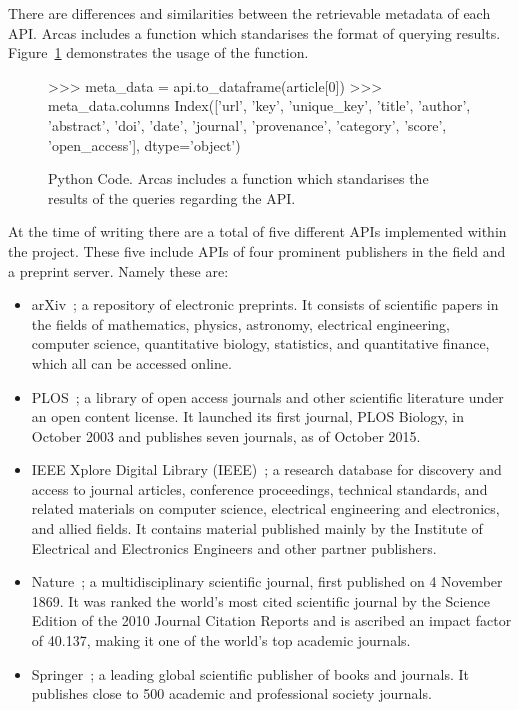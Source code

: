 There are differences and similarities between the retrievable metadata of each API. Arcas
includes a function which standarises the format of querying results. Figure~\ref{fig:arcas_to_dataframe}
demonstrates the usage of the function.

\begin{figure}[!hbtp]
    \begin{usagepy}
>>> meta_data = api.to_dataframe(article[0])
>>> meta_data.columns
Index(['url', 'key', 'unique_key', 'title', 'author', 'abstract', 'doi',
'date', 'journal', 'provenance', 'category', 'score', 'open_access'],
dtype='object')
\end{usagepy}
\caption{Python Code. Arcas includes a function which standarises the results of
the queries regarding the API.}\label{fig:arcas_to_dataframe}
\end{figure}

At the time of writing there are a total of five different APIs implemented within the project. These
five include APIs of four prominent publishers in the field and a preprint
server. Namely these are:

\begin{multicols}{2}
    \begin{itemize}
        \item arXiv~\cite{mckiernan2000}; a repository of electronic preprints.
        It consists of scientific
        papers in the fields of mathematics, physics, astronomy, electrical engineering,
        computer science, quantitative biology, statistics, and quantitative finance,
        which all can be accessed online.
        \item PLOS~\cite{plos}; a library of open access journals and other scientific literature
        under an open content license. It launched its first journal, PLOS Biology,
        in October 2003 and publishes seven journals, as of October 2015.
        \item IEEE Xplore Digital Library (IEEE)~\cite{ieee}; a research database for discovery
        and access to journal articles, conference proceedings, technical standards,
        and related materials on computer science, electrical engineering and electronics,
        and allied fields. It contains material published mainly by the Institute of
        Electrical and Electronics Engineers and other partner publishers. 
        \item Nature~\cite{nature}; a multidisciplinary scientific journal,
        first published on 4 November 1869. It was ranked the world's most cited
        scientific journal by the Science Edition of the 2010 Journal Citation Reports
        and is ascribed an impact factor of 40.137, making it one of the world's
        top academic journals.
        \item Springer~\cite{springer}; a leading global scientific publisher of
        books and journals. It publishes close to 500 academic and professional
        society journals.
    \end{itemize}
\end{multicols}

